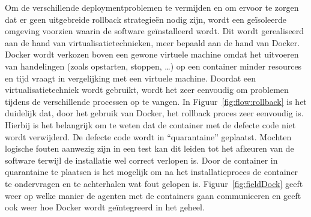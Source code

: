 Om de verschillende deploymentproblemen te vermijden en om ervoor te zorgen dat er geen uitgebreide rollback strategieën nodig zijn, wordt een geïsoleerde omgeving voorzien waarin de software geïnstalleerd wordt. 
Dit wordt gerealiseerd aan de hand van virtualisatietechnieken, meer bepaald aan de hand van Docker.
Docker wordt verkozen boven een gewone virtuele machine omdat het uitvoeren van handelingen (zoals opstarten, stoppen, \ldots) op een container minder resources en tijd vraagt in vergelijking met een virtuele machine.
Doordat een virtualisatietechniek wordt gebruikt, wordt het zeer eenvoudig om problemen tijdens de verschillende processen op te vangen.
In Figuur~\ref{fig:flow:rollback} is het duidelijk dat, door het gebruik van Docker, het rollback proces zeer eenvoudig is.
Hierbij is het belangrijk om te weten dat de container met de defecte code niet wordt verwijderd.
De defecte code wordt in ``quarantaine'' geplaatst.
Mochten logische fouten aanwezig zijn in een test kan dit leiden tot het afkeuren van de software terwijl de installatie wel correct verlopen is.
Door de container in quarantaine te plaatsen is het mogelijk om na het installatieproces de container te ondervragen en te achterhalen wat fout gelopen is.
Figuur~\ref{fig:fieldDock} geeft weer op welke manier de agenten met de containers gaan communiceren en geeft ook weer hoe Docker wordt geïntegreerd in het geheel.

